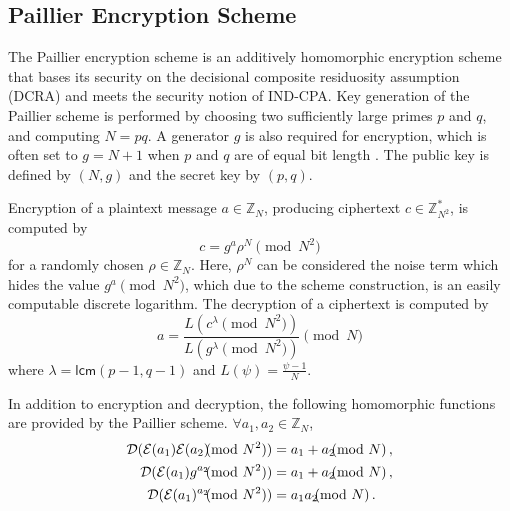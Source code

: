 \documentclass[10pt,letterpaper,oneside,twocolumn,journal]{IEEEtran}
\theoremstyle{definition}
\theoremstyle{definition}
\theoremstyle{remark}
\begin{document}
% 
% 

\subsection{Paillier Encryption Scheme} \label{subsec:paillier_scheme}
The Paillier encryption scheme \cite{paillierPublicKeyCryptosystemsBased1999} is an additively homomorphic encryption scheme that bases its security on the decisional composite residuosity assumption (DCRA) and meets the security notion of IND-CPA. Key generation of the Paillier scheme is performed by choosing two sufficiently large primes $p$ and $q$, and computing $N=pq$. A generator $g$ is also required for encryption, which is often set to $g=N+1$ when $p$ and $q$ are of equal bit length \cite{katzIntroductionModernCryptography2008}. The public key is defined by $(N, g)$ and the secret key by $(p, q)$.

Encryption of a plaintext message $a \in \mathbb{Z}_N$, producing ciphertext $c \in \mathbb{Z}^{*}_{N^2}$, is computed by
\begin{equation}
    c = g^a \rho^N \pmod{N^2}
\end{equation}
for a randomly chosen $\rho \in \mathbb{Z}_{N}$. Here, $\rho^N$ can be considered the noise term which hides the value $g^a \pmod{N^2}$, which due to the scheme construction, is an easily computable discrete logarithm. The decryption of a ciphertext is computed by
\begin{equation}
    a = \frac{L(c^\lambda\pmod{N^2})}{L(g^\lambda\pmod{N^2})} \pmod{N}
\end{equation}
where $\lambda = \mathsf{lcm}(p-1, q-1)$ and $L(\psi) = \frac{\psi-1}{N}$.

In addition to encryption and decryption, the following homomorphic functions are provided by the Paillier scheme. $\forall a_1,a_2 \in \mathbb{Z}_N$,
\begin{align}
    \mathcal{D}(\mathcal{E}(a_1)\mathcal{E}(a_2) \hspace{-7pt} \pmod{N^2}) &= a_1+a_2 \hspace{-7pt} \pmod{N}\,, \label{eqn:paillier_hom_add}\\
    \mathcal{D}(\mathcal{E}(a_1)g^{a_2} \hspace{-7pt} \pmod{N^2}) &= a_1+a_2\hspace{-7pt}\pmod{N}\,, \label{eqn:paillier_hom_plain_add}\\
    \mathcal{D}(\mathcal{E}(a_1)^{a_2} \hspace{-7pt} \pmod{N^2}) &= a_1a_2 \hspace{-7pt} \pmod{N}\,. \label{eqn:paillier_hom_mult}
\end{align}
\end{document}
